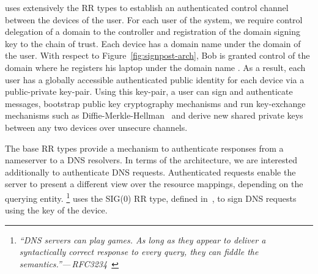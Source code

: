\signpost uses extensively the \dnssec RR types to establish an authenticated
control channel between the devices of the user. For each user of the \signpost
system, we require control delegation of a domain to the \signpost controller
and registration of the domain signing key to the \dnssec chain of trust. Each
device has a domain name under the domain  of the user. With respect to
Figure~\ref{fig:signpost-arch}, Bob is granted control of the domain 
where he registers his laptop under the domain name . As a
result, each \signpost user has a globally accessible authenticated public
identity for each device via a public-private key-pair. Using this key-pair, a
user can sign and authenticate messages, bootstrap public key cryptography
mechanisms and run key-exchange mechanisms such as
Diffie-Merkle-Hellman~\cite{RFC2631} and derive new shared private keys between
any two devices over unsecure channels.

The base \dnssec RR types  provide a mechanism to authenticate responses from a
nameserver to a DNS resolvers. In terms of the \signpost architecture, we are
interested additionally to authenticate DNS requests. Authenticated requests
enable the server to present a different view over the resource mappings,
depending on the querying entity.  \footnote{{\em ``DNS servers can play games.
    As long as they appear to deliver a syntactically correct response to every
    query, they can fiddle the semantics.''---\,RFC3234~\cite{RFC3234}}}
\signpost uses the SIG(0) RR type, defined in~\cite{RFC2931}, to sign DNS
requests using the key of the device.  


